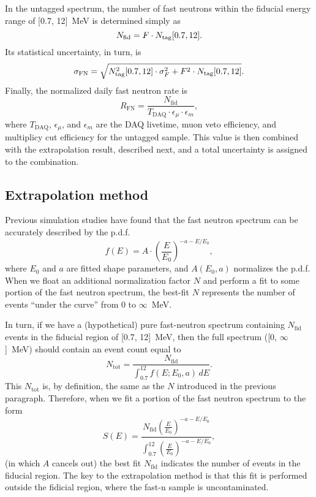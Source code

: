 \documentclass[../thesis.tex]{subfiles}
\begin{document}
\def\nfn{\ensuremath{N_\mathrm{fid}}} \def\rfn{\ensuremath{R_\mathrm{FN}}}

In the untagged spectrum, the number of fast neutrons within the fiducial energy range of [0.7, 12]~MeV is determined simply as
\[ \nfn = F \cdot \ntag[0.7, 12]. \] Its statistical uncertainty, in turn, is
\begin{equation}
  \label{eq:fastn_scal_unc}
  \sigma_\mathrm{FN} = \sqrt{N_\mathrm{tag}^2[0.7, 12]
    \cdot \sigma_F^2 + F^2 \cdot N_\mathrm{tag}[0.7, 12]}.
\end{equation}
Finally, the normalized daily fast neutron rate is
\begin{equation}
  \label{eq:fastn_rate}
  \rfn = \frac{\nfn}{T_\mathrm{DAQ} \cdot \epsilon_\mu \cdot \epsilon_m},
\end{equation}
where $T_\mathrm{DAQ}$, $\epsilon_\mu$, and $\epsilon_m$ are the DAQ livetime, muon veto efficiency, and multiplicy cut efficiency for the untagged sample. This value is then combined with the extrapolation result, described next, and a total uncertainty is assigned to the combination.

\subsection{Extrapolation method}
\label{sec:fastn_extrap}

Previous simulation studies have found that the fast neutron spectrum can be accurately described by the p.d.f.
\[ f(E) = A \cdot \left( \frac{E}{E_0} \right)^{-a-E/E_0}, \] where $E_0$ and $a$ are fitted shape parameters, and $A(E_0, a)$ normalizes the p.d.f. When we float an additional normalization factor $N$ and perform a fit to some portion of the fast neutron spectrum, the best-fit $N$ represents the number of events ``under the curve'' from 0 to $\infty$~MeV.

In turn, if we have a (hypothetical) pure fast-neutron spectrum containing $N_\mathrm{fid}$ events in the fiducial region of [0.7, 12]~MeV, then the full spectrum ([0, $\infty$]~MeV) should contain an event count equal to
\[ N_\mathrm{tot} = \frac{N_\mathrm{fid}}{\int_{0.7}^{12} f(E; E_0, a)\,dE }. \] This $N_\mathrm{tot}$ is, by definition, the same as the $N$ introduced in the previous paragraph. Therefore, when we fit a portion of the fast neutron spectrum to the form
\begin{equation}
  \label{eq:fastn_extrap_form}
  S(E) = \frac{N_\mathrm{fid} \left( \frac{E}{E_0} \right)^{-a-E/E_0}}
  {\int_{0.7}^{12} \left( \frac{E}{E_0} \right)^{-a-E/E_0} },
\end{equation}
(in which $A$ cancels out) the best fit $N_\mathrm{fid}$ indicates the number of events in the fiducial region. The key to the extrapolation method is that this fit is performed outside the fidicial region, where the fast-n sample is uncontaminated.
\end{document}
